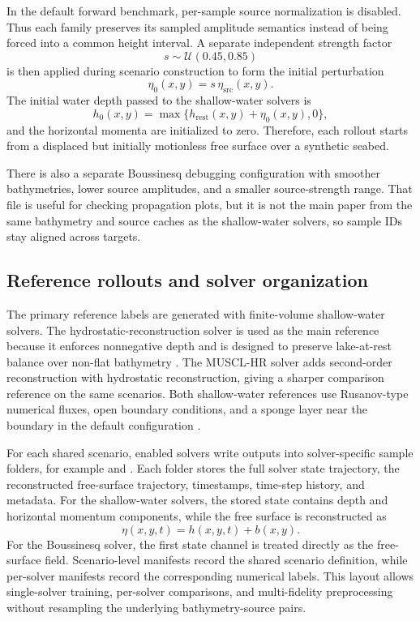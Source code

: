 In the default forward benchmark, per-sample source normalization is disabled. Thus each family preserves its sampled amplitude semantics instead of being forced into a common height interval. A separate independent strength factor
\[
s\sim\mathcal{U}(0.45, 0.85) %
\]
is then applied during scenario construction to form the initial perturbation
\[
\eta_0(x,y)=s\,\eta_{\mathrm{src}}(x,y).
\]
The initial water depth passed to the shallow-water solvers is
\[
h_0(x,y)=\max\{h_{\mathrm{rest}}(x,y)+\eta_0(x,y),0\},
\]
and the horizontal momenta are initialized to zero. Therefore, each rollout starts from a displaced but initially motionless free surface over a synthetic seabed.

There is also a separate Boussinesq debugging configuration with smoother bathymetries, lower source amplitudes, and a smaller source-strength range. That file is useful for checking propagation plots, but it is not the main paper from the same bathymetry and source caches as the shallow-water solvers, so sample IDs stay aligned across targets.

\subsection{Reference rollouts and solver organization}
\label{subsec:reference-rollouts}

The primary reference labels are generated with finite-volume shallow-water solvers. The hydrostatic-reconstruction solver is used as the main reference because it enforces nonnegative depth and is designed to preserve lake-at-rest balance over non-flat bathymetry \citep{audusse2004hydrostatic}. The MUSCL-HR solver adds second-order reconstruction with hydrostatic reconstruction, giving a sharper comparison reference on the same scenarios. Both shallow-water references use Rusanov-type numerical fluxes, open boundary conditions, and a sponge layer near the boundary in the default configuration \citep{leveque2002finite,toro2009riemann,clain2016secondorder}.

For each shared scenario, enabled solvers write outputs into solver-specific sample folders, for example  and . Each folder stores the full solver state trajectory, the reconstructed free-surface trajectory, timestamps, time-step history, and metadata. For the shallow-water solvers, the stored state contains depth and horizontal momentum components, while the free surface is reconstructed as
\[
\eta(x,y,t)=h(x,y,t)+b(x,y).
\]
For the Boussinesq solver, the first state channel is treated directly as the free-surface field. Scenario-level manifests record the shared scenario definition, while per-solver manifests record the corresponding numerical labels. This layout allows single-solver training, per-solver comparisons, and multi-fidelity preprocessing without resampling the underlying bathymetry-source pairs.

